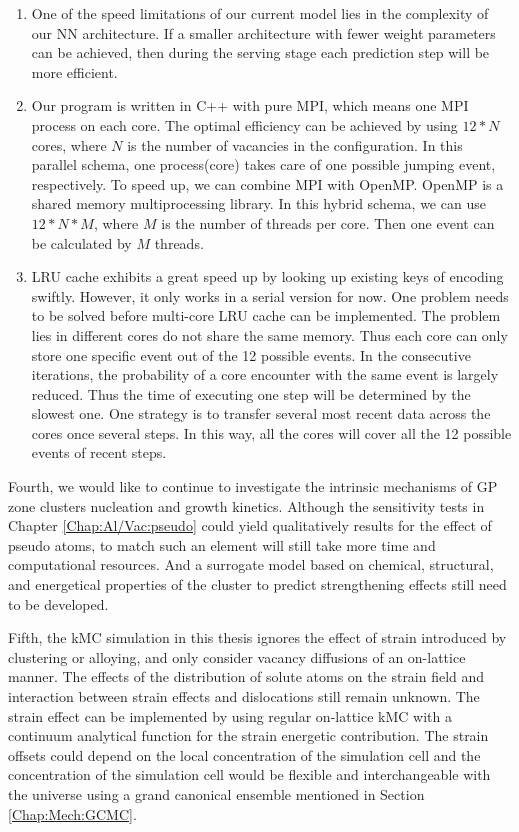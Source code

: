 \begin{enumerate}

  \item One of the speed limitations of our current model lies in the complexity of our \ac{NN} architecture. If a smaller architecture with fewer weight parameters can be achieved, then during the serving stage each prediction step will be more efficient.

  \item Our program is written in C++ with pure \ac{MPI}, which means one \ac{MPI} process on each core. The optimal efficiency can be achieved by using $12*N$ cores, where $N$ is the number of vacancies in the configuration. In this parallel schema, one process(core) takes care of one possible jumping event, respectively. To speed up, we can combine \ac{MPI} with OpenMP. OpenMP is a shared memory multiprocessing library. In this hybrid schema, we can use $12*N*M$, where $M$ is the number of threads per core. Then one event can be calculated by $M$ threads.

  \item \ac{LRU} cache exhibits a great speed up by looking up existing keys of encoding swiftly. However, it only works in a serial version for now. One problem needs to be solved before multi-core \ac{LRU} cache can be implemented. The problem lies in different cores do not share the same memory. Thus each core can only store one specific event out of the 12 possible events. In the consecutive iterations, the probability of a core encounter with the same event is largely reduced. Thus the time of executing one step will be determined by the slowest one. One strategy is to transfer several most recent data across the cores once several steps. In this way, all the cores will cover all the 12 possible events of recent steps.

\end{enumerate}

Fourth, we would like to continue to investigate the intrinsic mechanisms of GP zone clusters nucleation and growth kinetics. Although the sensitivity tests in Chapter \ref{Chap:Al/Vac:pseudo} could yield qualitatively results for the effect of pseudo atoms, to match such an element will still take more time and computational resources. And a surrogate model based on chemical, structural, and energetical properties of the cluster to predict strengthening effects still need to be developed.

Fifth, the \ac{kMC} simulation in this thesis ignores the effect of strain introduced by clustering or alloying, and only consider vacancy diffusions of an on-lattice manner. The effects of the distribution of solute atoms on the strain field and interaction between strain effects and dislocations still remain unknown. The strain effect can be implemented by using regular on-lattice \ac{kMC} with a continuum analytical function for the strain energetic contribution. The strain offsets could depend on the local concentration of the simulation cell and the concentration of the simulation cell would be flexible and interchangeable with the universe using a grand canonical ensemble mentioned in Section \ref{Chap:Mech:GCMC}.

